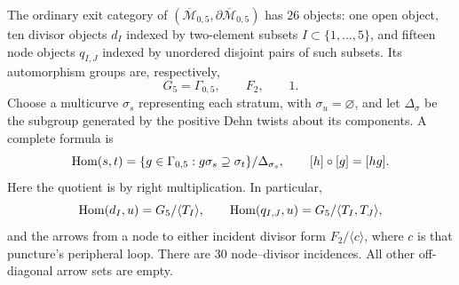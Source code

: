\begin{proposition}\label{P1e3}
The ordinary exit category of
$(\overline{\mathcal M}_{0,5},\partial\overline{\mathcal M}_{0,5})$
has $26$ objects: one open object, ten divisor objects $d_I$ indexed by
two-element subsets $I\subset\{1,\ldots,5\}$, and fifteen node objects
$q_{I,J}$ indexed by unordered disjoint pairs of such subsets. Its
automorphism groups are, respectively,
\[
 G_5=\Gamma_{0,5},\qquad F_2,\qquad 1.
\]
Choose a multicurve $\sigma_s$ representing each stratum, with
$\sigma_u=\varnothing$, and let $\Delta_\sigma$ be the subgroup generated
by the positive Dehn twists about its components. A complete formula is
\begin{equation}\label{eq:M05-transporter}
 \operatorname{Hom}(s,t)=
 \{g\in\Gamma_{0,5}:g\sigma_s\supseteq\sigma_t\}/\Delta_{\sigma_s},
 \qquad [h]\circ[g]=[hg].
\end{equation}
Here the quotient is by right multiplication. In particular,
\[
 \operatorname{Hom}(d_I,u)=G_5/\langle T_I\rangle,\qquad
 \operatorname{Hom}(q_{I,J},u)=G_5/\langle T_I,T_J\rangle,
\]
and the arrows from a node to either incident divisor form
$F_2/\langle c\rangle$, where $c$ is that puncture's peripheral loop.
There are $30$ node--divisor incidences. All other off-diagonal arrow
sets are empty.
\end{proposition}
